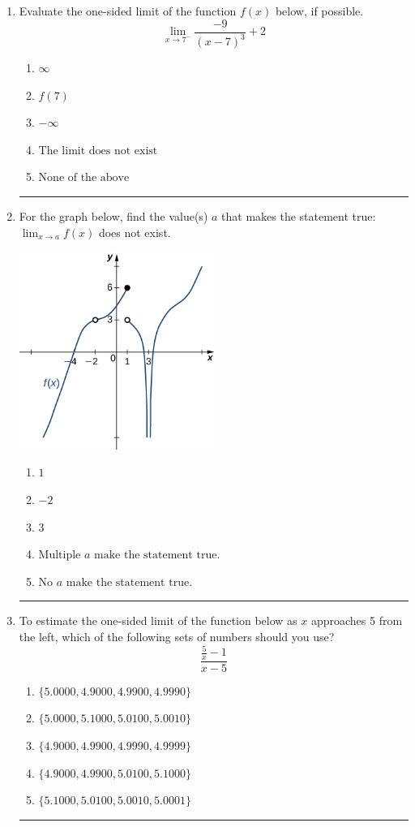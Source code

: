 \documentclass[14pt]{extbook}
\newcommand{\litem}[1]{\item#1\hspace*{-1cm}\rule{\textwidth}{0.4pt}}
\begin{document}
\begin{enumerate}
\litem{
Evaluate the one-sided limit of the function $f(x)$ below, if possible.\[ \lim_{x \rightarrow 7^-} \frac{-9}{(x-7)^3}+2 \]\begin{enumerate}[label=\Alph*.]
\item \( \infty \)
\item \( f(7) \)
\item \( -\infty \)
\item \( \text{The limit does not exist} \)
\item \( \text{None of the above} \)

\end{enumerate} }
\litem{
For the graph below, find the value(s) $a$ that makes the statement true: $ \displaystyle \lim_{x \rightarrow a} f(x)$ does not exist.
\begin{center}
    \includegraphics[width=0.5\textwidth]{../Figures/evaluateLimitGraphicallyA.png}
\end{center}
\begin{enumerate}[label=\Alph*.]
\item \( 1 \)
\item \( -2 \)
\item \( 3 \)
\item \( \text{Multiple } a \text{ make the statement true}. \)
\item \( \text{No } a \text{ make the statement true}. \)

\end{enumerate} }
\litem{
To estimate the one-sided limit of the function below as $x$ approaches 5 from the left, which of the following sets of numbers should you use?\[ \frac{\frac{5}{x} - 1}{x - 5} \]\begin{enumerate}[label=\Alph*.]
\item \( \{ 5.0000, 4.9000, 4.9900, 4.9990 \} \)
\item \( \{ 5.0000, 5.1000, 5.0100, 5.0010 \} \)
\item \( \{ 4.9000, 4.9900, 4.9990, 4.9999 \} \)
\item \( \{ 4.9000, 4.9900, 5.0100, 5.1000 \} \)
\item \( \{ 5.1000, 5.0100, 5.0010, 5.0001 \} \)


\end{enumerate}}
\end{enumerate}
\end{document}
